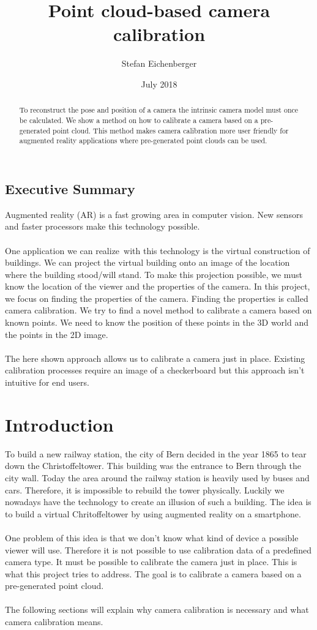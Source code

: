 \documentclass[11pt,a4paper,titlepage,oneside]{report}
\title{Point cloud-based camera calibration}
\author{Stefan Eichenberger}
\date{July 2018}
\begin{document}
\maketitle

\begin{abstract}
To reconstruct the pose and position of a camera the intrinsic camera model must once be calculated. We show a method on how to calibrate a camera based on a pre-generated point cloud. This method makes camera calibration more user friendly for augmented reality applications where pre-generated point clouds can be used.
\end{abstract}

\section*{Executive Summary}
Augmented reality (AR) is a fast growing area in computer vision. New sensors and faster processors make this technology possible.\\\\
One application we can realize with this technology is the virtual construction of buildings. We can project the virtual building onto an image of the location where the building stood/will stand. To make this projection possible, we must know the location of the viewer and the properties of the camera. In this project, we focus on finding the properties of the camera. Finding the properties is called camera calibration. We try to find a novel method to calibrate a camera based on known points. We need to know the position of these points in the 3D world and the points in the 2D image.\\\\
The here shown approach allows us to calibrate a camera just in place. Existing calibration processes require an image of a checkerboard but this approach isn't intuitive for end users.

\tableofcontents

\chapter{Introduction}
To build a new railway station, the city of Bern decided in the year 1865 to tear down the Christoffeltower. This building was the entrance to Bern through the city wall. Today the area around the railway station is heavily used by buses and cars. Therefore, it is impossible to rebuild the tower physically. Luckily we nowadays have the technology to create an illusion of such a building. The idea is to build a virtual Chritoffeltower by using augmented reality on a smartphone.\\\\
One problem of this idea is that we don't know what kind of device a possible viewer will use. Therefore it is not possible to use calibration data of a predefined camera type. It must be possible to calibrate the camera just in place. This is what this project tries to address. The goal is to calibrate a camera based on a pre-generated point cloud.\\\\
The following sections will explain why camera calibration is necessary and what camera calibration means.
\end{document}

